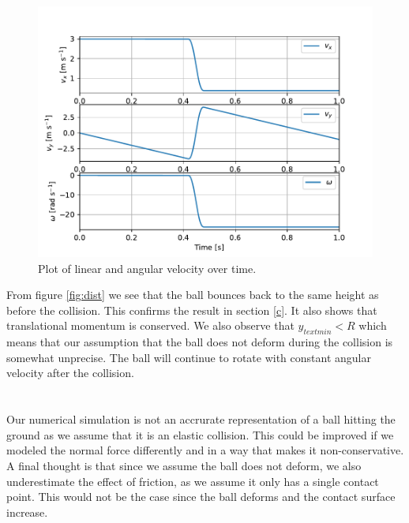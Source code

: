 \documentclass[a4paper,10pt,english]{article}
\begin{document}
\begin{figure}[h!]
	\centering
	\includegraphics[scale=0.7]{velocities.pdf}
	\caption{Plot of linear and angular velocity over time.}
	\label{fig:vel}
\end{figure}

From figure \ref{fig:dist} we see that the ball bounces back to the same height as before the collision. This confirms the result in section \ref{c}. It also shows that translational momentum is conserved. We also observe that $y_{text{min}} < R$ which means that our assumption that the ball does not deform during the collision is somewhat unprecise. The ball will continue to rotate with constant angular velocity after the collision.

\section{}
Our numerical simulation is not an accrurate representation of a ball hitting the ground as we assume that it is an elastic collision. This could be improved if we modeled the normal force differently and in a way that makes it non-conservative. A final thought is that since we assume the ball does not deform, we also underestimate the effect of friction, as we assume it only has a single contact point. This would not be the case since the ball deforms and the contact surface increase.
\end{document}
